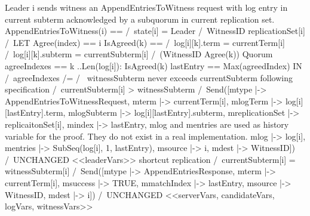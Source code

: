 \documentclass{standalone}
\begin{document}
\onehalfspacing

    \begin{tla}

\* Leader i sends witness an AppendEntriesToWitness request with log entry 
\* in current subterm acknowledged by a subquorum in current replication set.
AppendEntriesToWitness(i) ==
    /\ state[i] = Leader
    /\ WitnessID \in replicationSet[i]
    /\ LET Agree(index) == 
               {i} 
           IsAgreed(k)  ==
               /\ log[i][k].term    = currentTerm[i]
               /\ log[i][k].subterm = currentSubterm[i]
               /\ ({WitnessID} \cup Agree(k)) \in Quorum
           agreeIndexes == { k ..Len(log[i]): IsAgreed(k) }
           lastEntry    == Max(agreedIndex)
       IN /\ agreeIndexes /= {}
          /\ \/ \* witnessSubterm never exceeds currentSubterm following specification
                /\ currentSubterm[i] > witnessSubterm
                /\ Send([mtype           |-> AppendEntriesToWitnessRequest,
                         mterm           |-> currentTerm[i],
                         mlogTerm        |-> log[i][lastEntry].term,
                         mlogSubterm     |-> log[i][lastEntry].subterm,
                         mreplicationSet |-> replicaitonSet[i],
                         mindex          |-> lastEntry,
                         \* mlog and mentries are used as history variable for
                         \* the proof. They do not exist in a real implementation.
                         mlog            |-> log[i],
                         mentries        |-> SubSeq(log[i], 1, lastEntry),
                         msource         |-> i,
                         mdest           |-> WitnessID])
                /\ UNCHANGED <<leaderVars>>
             \/ \* shortcut replication
                /\ currentSubterm[i] = witnessSubterm[i]
                /\ Send([mtype           |-> AppendEntriesResponse,
                         mterm           |-> currentTerm[i],
                         msuccess        |-> TRUE,
                         mmatchIndex     |-> lastEntry,
                         msource         |-> WitnessID,
                         mdest           |-> i])
    /\ UNCHANGED <<serverVars, candidateVars, logVars, witnessVars>>
    \end{tla}
\end{document}
